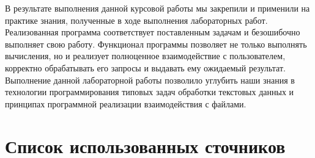 \documentclass[12pt,a4paper]{article}  %
\begin{document}
В результате выполнения данной курсовой работы мы закрепили и применили на практике знания, полученные в ходе выполнения лабораторных работ. Реализованная программа соответствует поставленным задачам и безошибочно выполняет свою работу. Функционал программы позволяет не только выполнять вычисления, но и реализует полноценное взаимодействие с пользователем, корректно обрабатывать его запросы и выдавать ему ожидаемый результат. Выполнение данной лабораторной работы позволило углубить наши знания в технологии программирования типовых задач обработки текстовых данных и принципах программной реализации взаимодействия с файлами.


\newpage
\section*{Список использованных сточников}
\setcounter{figure}{0}

\end{document}
